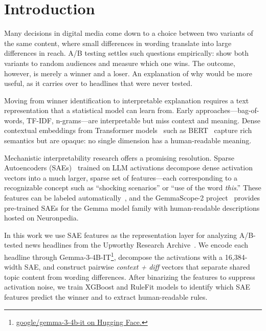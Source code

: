 \documentclass[sigconf,natbib=false, language=english]{acmart}
\begin{document}
\section{Introduction}

Many decisions in digital media come down to a choice between two variants of the same
content, where small differences in wording translate into large differences in reach.
A/B testing settles such questions empirically: show both variants to random audiences
and measure which one wins. The outcome, however, is merely a winner and a loser. An
explanation of why would be more useful, as it carries over to headlines that were
never tested.

Moving from winner identification to interpretable explanation requires a text representation that a statistical model can learn from. Early approaches---bag-of-words, TF-IDF, n-grams---are interpretable but miss context and meaning. Dense contextual embeddings from Transformer models~\cite{vaswani2017attention} such as BERT~\cite{devlin2019bert} capture rich semantics but are opaque: no single dimension has a human-readable meaning.

Mechanistic interpretability research offers a promising resolution. Sparse Autoencoders (SAEs)~\cite{bricken2023monosemanticity, cunningham2023sparse} trained on LLM activations decompose dense activation vectors into a much larger, sparse set of features---each corresponding to a recognizable concept such as ``shocking scenarios'' or ``use of the word \emph{this}.'' These features can be labeled automatically~\cite{bills2023language}, and the GemmaScope-2 project~\cite{lieberum2024gemma} provides pre-trained SAEs for the Gemma model family with human-readable descriptions hosted on Neuronpedia.

In this work we use SAE features as the representation layer for analyzing A/B-tested news headlines from the Upworthy Research Archive~\cite{matias2021upworthy}. We encode each headline through Gemma-3-4B-IT\footnote{\href{https://huggingface.co/google/gemma-3-4b-it}{google/gemma-3-4b-it on Hugging Face.}}, decompose the activations with a 16,384-width SAE, and construct pairwise \emph{context + diff} vectors that separate shared topic content from wording differences. After binarizing the features to suppress activation noise, we train XGBoost and RuleFit models to identify which SAE features predict the winner and to extract human-readable rules.
\end{document}

